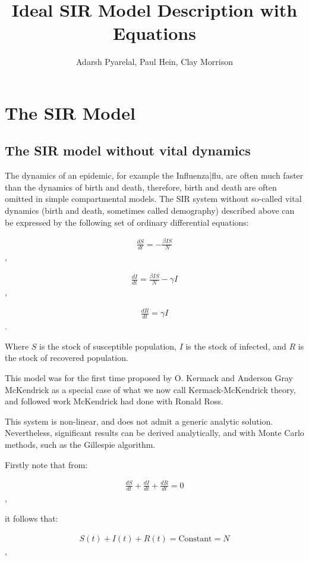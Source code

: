 \documentclass{article}
\title{Ideal SIR Model Description with Equations}
\author{Adarsh Pyarelal, Paul Hein, Clay Morrison}
\begin{document}
\section{The SIR Model}

\subsection{The SIR model without vital dynamics}

The dynamics of an epidemic, for example the Influenza|flu, are often much
faster than the dynamics of birth and death, therefore, birth and death are
often omitted in simple compartmental models.  The SIR system without so-called
vital dynamics (birth and death, sometimes called demography) described above
can be expressed by the following set of ordinary differential
equations:

\begin{align}\frac{dS}{dt} = - \frac{\beta I S}{N} \end{align},

\begin{align}\frac{dI}{dt} = \frac{\beta I S}{N}- \gamma I \end{align},

\begin{align}\frac{dR}{dt} = \gamma I \end{align}.

Where $S$ is the stock of susceptible population, $I$ is the stock of infected, and $R$ is the stock of recovered population.

This model was for the first time proposed by O. Kermack and Anderson Gray McKendrick as a special case of what we now call Kermack-McKendrick theory, and followed work McKendrick had done with Ronald Ross.

This system is non-linear, and does not admit a generic analytic solution. Nevertheless, significant results can be derived analytically, and with Monte Carlo methods, such as the Gillespie algorithm.

Firstly note that from:

\begin{align}\frac{dS}{dt} + \frac{dI}{dt} + \frac{dR}{dt}  = 0  \end{align},

it follows that:

\begin{align}S(t) + I(t) + R(t) = \textrm{Constant} = N  \end{align},
\end{document}
